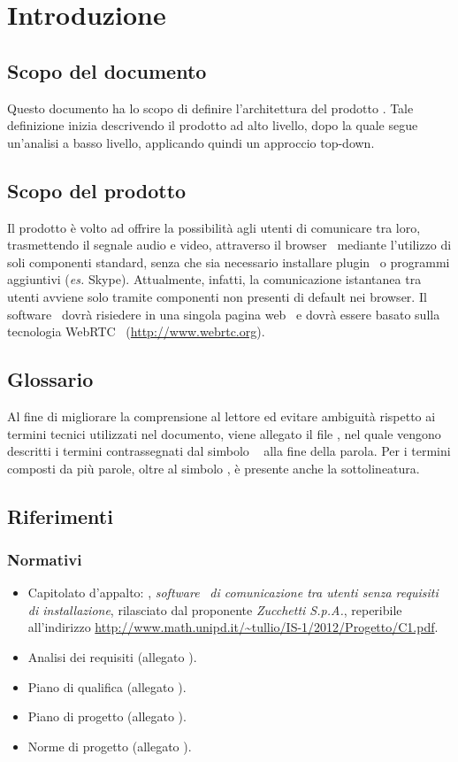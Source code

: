 \section{Introduzione}{
    \subsection{Scopo del documento}{
	Questo documento ha lo scopo di definire l'architettura del prodotto \textbf{\mytalk}. Tale definizione inizia descrivendo il prodotto ad alto livello, dopo la quale segue un'analisi a basso livello, applicando quindi un approccio top-down\g.
    }
    
    \subsection{Scopo del prodotto}{
      Il prodotto \textbf{\mytalk} è volto ad offrire la possibilità agli utenti di comunicare tra loro, trasmettendo il segnale audio e video, attraverso 
      il browser\g~ mediante l'utilizzo di soli componenti standard, senza che sia necessario installare plugin\g~ o programmi aggiuntivi 
      (\textit{es.} Skype). Attualmente, infatti, la comunicazione istantanea tra utenti avviene solo tramite componenti non presenti di default nei
      browser\g . Il software\g~ dovrà risiedere in una singola pagina web\g~ e dovrà essere basato sulla tecnologia WebRTC\g~ 
      (\url {http://www.webrtc.org}).
    }

    \subsection{Glossario}{
	Al fine di migliorare la comprensione al lettore ed evitare ambiguità rispetto ai termini tecnici utilizzati nel documento, viene allegato il file
	\emph{\Glossario},  nel quale vengono descritti i termini contrassegnati dal simbolo \g~ alla fine della parola.
	Per i termini composti da più parole, oltre al simbolo \g, è presente anche la sottolineatura. 
    }

    \subsection{Riferimenti}{
	\subsubsection{Normativi}{
	    \begin{itemize}
		\item Capitolato d'appalto: \textbf{\mytalk}, \textit{software}\g~ \textit{di comunicazione tra utenti senza requisiti  di installazione}, rilasciato dal 
		      proponente \textit{Zucchetti S.p.A.}, reperibile all'indirizzo \url{http://www.math.unipd.it/~tullio/IS-1/2012/Progetto/C1.pdf}.
		\item Analisi dei requisiti (allegato \textit{\AnalisiDeiRequisiti}).
		\item Piano di qualifica (allegato \textit{\PianoDiQualifica}).
		\item Piano di progetto (allegato \textit{\PianoDiProgetto}).
		\item Norme di progetto (allegato \textit{\NormeDiProgetto}).
	    \end{itemize}
	}
}}
